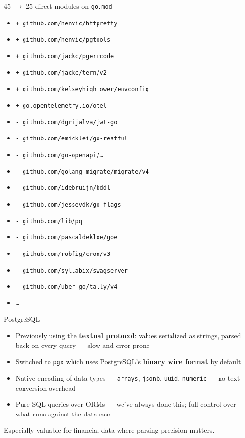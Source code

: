 \documentclass[aspectratio=169,11pt]{beamer}
\newcommand{\removed}[1]{\textcolor{removed}{\texttt{-\,#1}}}
\newcommand{\added}[1]{\textcolor{added}{\texttt{+\,#1}}}
\begin{document}
\begin{frame}{45 \(\rightarrow\) 25 direct modules on \texttt{go.mod}}
  \begin{itemize}\scriptsize\setlength\itemsep{1pt}
    \item[] \added{github.com/henvic/httpretty}
    \item[] \added{github.com/henvic/pgtools}
    \item[] \added{github.com/jackc/pgerrcode}
    \item[] \added{github.com/jackc/tern/v2}
    \item[] \added{github.com/kelseyhightower/envconfig}
    \item[] \added{go.opentelemetry.io/otel}
    \item[] \removed{github.com/dgrijalva/jwt-go}
    \item[] \removed{github.com/emicklei/go-restful}
    \item[] \removed{github.com/go-openapi/\ldots}
    \item[] \removed{github.com/golang-migrate/migrate/v4}
    \item[] \removed{github.com/idebruijn/bddl}
    \item[] \removed{github.com/jessevdk/go-flags}
    \item[] \removed{github.com/lib/pq}
    \item[] \removed{github.com/pascaldekloe/goe}
    \item[] \removed{github.com/robfig/cron/v3}
    \item[] \removed{github.com/syllabix/swagserver}
    \item[] \removed{github.com/uber-go/tally/v4}
    \item[] \texttt{\ldots}
  \end{itemize}
\end{frame}

\begin{frame}{PostgreSQL}
  \begin{itemize}
    \setlength\itemsep{6pt}
    \item Previously using the \textbf{textual protocol}: values serialized as strings,
          parsed back on every query --- slow and error-prone
    \item Switched to \texttt{pgx} which uses PostgreSQL's \textbf{binary wire format} by default
    \item Native encoding of data types --- \texttt{arrays}, \texttt{jsonb}, \texttt{uuid}, \texttt{numeric} ---
          no text conversion overhead
    \item Pure SQL queries over ORMs --- we've always done this;
          full control over what runs against the database
  \end{itemize}

  \vspace{6pt}
  {\small Especially valuable for financial data where parsing precision matters.}
\end{frame}
\end{document}
